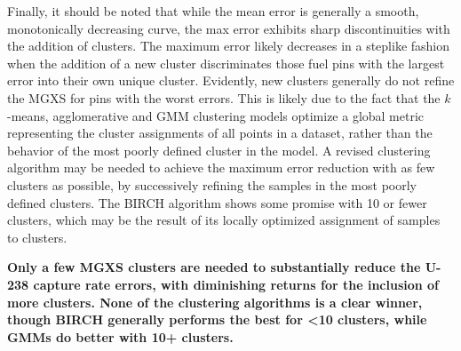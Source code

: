 Finally, it should be noted that while the mean error is generally a smooth, monotonically decreasing curve, the max error exhibits sharp discontinuities with the addition of clusters. The maximum error likely decreases in a steplike fashion when the addition of a new cluster discriminates those fuel pins with the largest error into their own unique cluster. Evidently, new clusters generally do not refine the \ac{MGXS} for pins with the worst errors. This is likely due to the fact that the $k$-means, agglomerative and \ac{GMM} clustering models optimize a global metric representing the cluster assignments of all points in a dataset, rather than the behavior of the most poorly defined cluster in the model. A revised clustering algorithm may be needed to achieve the maximum error reduction with as few clusters as possible, by successively refining the samples in the most poorly defined clusters. The BIRCH algorithm shows some promise with 10 or fewer clusters, which may be the result of its locally optimized assignment of samples to clusters.

\begin{emphbox}
\textbf{Only a few \ac{MGXS} clusters are needed to substantially reduce the U-238 capture rate errors, with diminishing returns for the inclusion of more clusters. None of the clustering algorithms is a clear winner, though BIRCH generally performs the best for <10 clusters, while \acp{GMM} do better with 10+ clusters.}
\end{emphbox}


